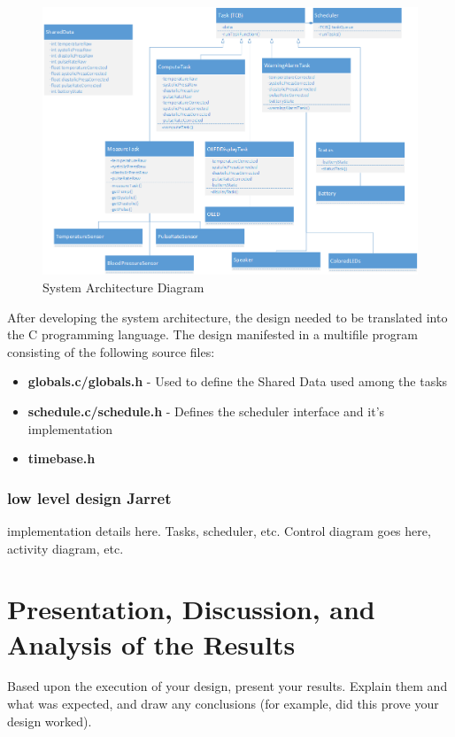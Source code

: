 \documentclass[12pt]{article} %
\begin{document}
\begin{figure}
    \centering
    \includegraphics[width=\textwidth]{../design/System_Architecture}
    \caption{System Architecture Diagram}
    \label{fig:arch}
\end{figure}

After developing the system architecture, the design needed to be translated into the C programming language.  The design manifested in a multifile program consisting of the following source files:
\begin{itemize}
  \item \textbf{globals.c/globals.h} - Used to define the Shared Data used among the tasks
  \item \textbf{schedule.c/schedule.h} - Defines the scheduler interface and it's implementation
  \item \textbf{timebase.h}
\end{itemize}

\subsubsection{low level design  Jarret}

implementation details here. Tasks, scheduler, etc. Control diagram goes here, activity diagram, etc.

\section{Presentation, Discussion, and Analysis of the Results}

Based upon the execution of your design, present your results. Explain them and what was expected, and draw any conclusions (for example, did this prove your design worked).
\end{document}
